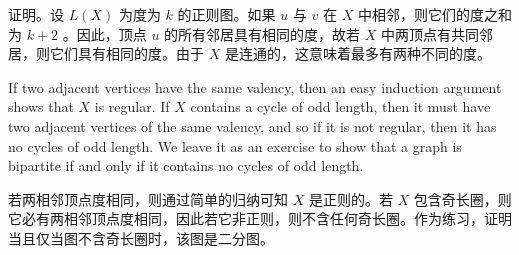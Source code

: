\documentclass[10pt]{article}
\begin{document}
\begin{tcolorbox}\relax
证明。设 \(L\left( X\right)\) 为度为 \(k\) 的正则图。如果 \(u\) 与 \(v\) 在 \(X\) 中相邻，则它们的度之和为 \(k + 2\) 。因此，顶点 \(u\) 的所有邻居具有相同的度，故若 \(X\) 中两顶点有共同邻居，则它们具有相同的度。由于 \(X\) 是连通的，这意味着最多有两种不同的度。
\end{tcolorbox}

If two adjacent vertices have the same valency, then an easy induction argument shows that \(X\) is regular. If \(X\) contains a cycle of odd length, then it must have two adjacent vertices of the same valency, and so if it is not regular, then it has no cycles of odd length. We leave it as an exercise to show that a graph is bipartite if and only if it contains no cycles of odd length.

\begin{tcolorbox}\relax
若两相邻顶点度相同，则通过简单的归纳可知 \(X\) 是正则的。若 \(X\) 包含奇长圈，则它必有两相邻顶点度相同，因此若它非正则，则不含任何奇长圈。作为练习，证明当且仅当图不含奇长圈时，该图是二分图。
\end{tcolorbox}
\end{document}
